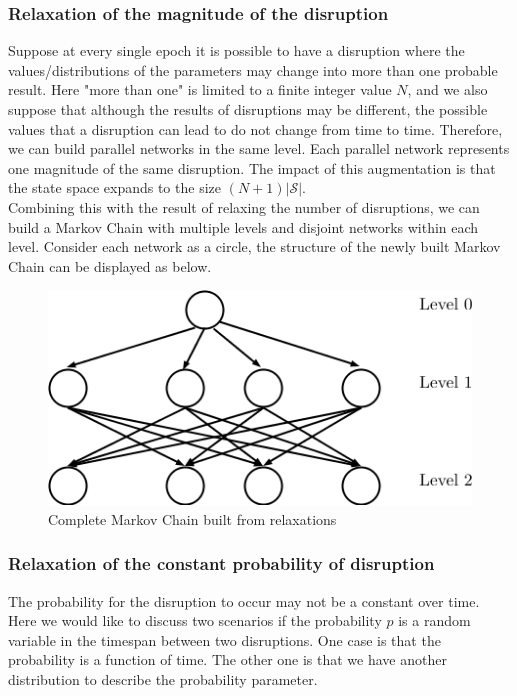 \documentclass[11pt]{article}
\begin{document}
		\subsubsection{Relaxation of the magnitude of the disruption}
			Suppose at every single epoch it is possible to have a disruption where the values/distributions of the parameters may change into more than one probable result. Here "more than one" is limited to a finite integer value \(N\), and we also suppose that although the results of disruptions may be different, the possible values that a disruption can lead to do not change from time to time. Therefore, we can build parallel networks in the same level. Each parallel network represents one magnitude of the same disruption. The impact of this augmentation is that the state space expands to the size \((N+1)|\mathscr{S}|\).\\
			\newline Combining this with the result of relaxing the number of disruptions, we can build a Markov Chain with multiple levels and disjoint networks within each level. Consider each network as a circle, the structure of the newly built Markov Chain can be displayed as below.
			\begin{figure}[H]
				\centering
				\includegraphics[width=\textwidth*3/4]{Multi_layer}
				\caption{Complete Markov Chain built from relaxations}
			\end{figure}
		\subsubsection{Relaxation of the constant probability of disruption}
			The probability for the disruption to occur may not be a constant over time. Here we would like to discuss two scenarios if the probability \(p\) is a random variable in the timespan between two disruptions. One case is that the probability is a function of time. The other one is that we have another distribution to describe the probability parameter.
\end{document}
